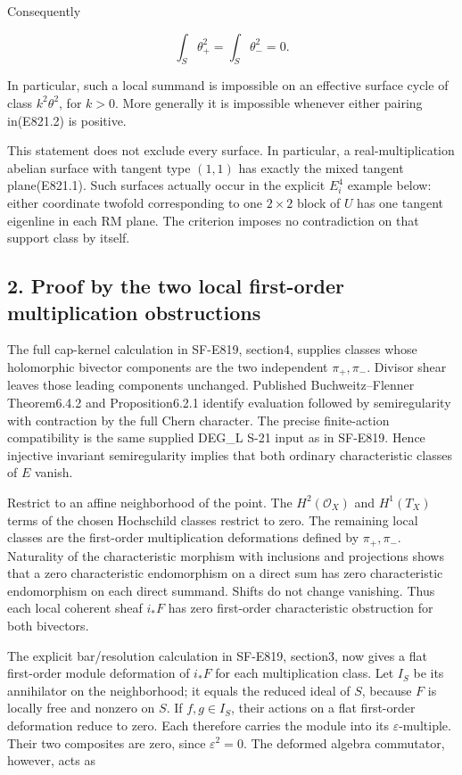 Consequently

\[
 \int_S\theta_+^2=\int_S\theta_-^2=0.
 \tag{E821.2}
\]

In particular, such a local summand is impossible on an effective
surface cycle of class \(k^2\theta^2\), for \(k>0\). More generally it
is impossible whenever either pairing in(E821.2) is positive.

This statement does not exclude every surface. In particular, a
real-multiplication abelian surface with tangent type \((1,1)\) has
exactly the mixed tangent plane(E821.1). Such surfaces actually occur in
the explicit \(E_i^4\) example below: either coordinate twofold
corresponding to one \(2\times2\) block of \(U\) has one tangent
eigenline in each RM plane. The criterion imposes no contradiction on
that support class by itself.

\subsection{2. Proof by the two local first-order multiplication
obstructions}\label{SF-E821-proof-by-the-two-local-first-order-multiplication-obstructions}

The full cap-kernel calculation in SF-E819, section4, supplies classes
whose holomorphic bivector components are the two independent
\(\pi_+,\pi_-\). Divisor shear leaves those leading components
unchanged. Published Buchweitz--Flenner Theorem6.4.2 and
Proposition6.2.1 identify evaluation followed by semiregularity with
contraction by the full Chern character. The precise finite-action
compatibility is the same supplied DEG\_L S-21 input as in SF-E819.
Hence injective invariant semiregularity implies that both ordinary
characteristic classes of \(E\) vanish.

Restrict to an affine neighborhood of the point. The
\(H^2(\mathcal O_X)\) and \(H^1(T_X)\) terms of the chosen Hochschild
classes restrict to zero. The remaining local classes are the
first-order multiplication deformations defined by \(\pi_+,\pi_-\).
Naturality of the characteristic morphism with inclusions and
projections shows that a zero characteristic endomorphism on a direct
sum has zero characteristic endomorphism on each direct summand. Shifts
do not change vanishing. Thus each local coherent sheaf \(i_*F\) has
zero first-order characteristic obstruction for both bivectors.

The explicit bar/resolution calculation in SF-E819, section3, now gives
a flat first-order module deformation of \(i_*F\) for each
multiplication class. Let \(I_S\) be its annihilator on the
neighborhood; it equals the reduced ideal of \(S\), because \(F\) is
locally free and nonzero on \(S\). If \(f,g\in I_S\), their actions on a
flat first-order deformation reduce to zero. Each therefore carries the
module into its \(\varepsilon\)-multiple. Their two composites are zero,
since \(\varepsilon^2=0\). The deformed algebra commutator, however,
acts as

